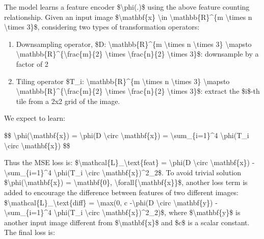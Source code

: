 The model learns a feature encoder \$\textbackslash phi(.)\$ using the above feature counting relationship. Given an input image \$\textbackslash mathbf\{x\} \textbackslash in \textbackslash mathbb\{R\}\^{}\{m \textbackslash times n \textbackslash times 3\}\$, considering two types of transformation operators:

\begin{enumerate}
\tightlist
\item
  Downsampling operator, \$D: \textbackslash mathbb\{R\}\^{}\{m \textbackslash times n \textbackslash times 3\} \textbackslash mapsto \textbackslash mathbb\{R\}\^{}\{\textbackslash frac\{m\}\{2\} \textbackslash times \textbackslash frac\{n\}\{2\} \textbackslash times 3\}\$: downsample by a factor of 2
\item
  Tiling operator \$T\_i: \textbackslash mathbb\{R\}\^{}\{m \textbackslash times n \textbackslash times 3\} \textbackslash mapsto \textbackslash mathbb\{R\}\^{}\{\textbackslash frac\{m\}\{2\} \textbackslash times \textbackslash frac\{n\}\{2\} \textbackslash times 3\}\$: extract the \$i\$-th tile from a 2x2 grid of the image.
\end{enumerate}

We expect to learn:

\$\$ \textbackslash phi(\textbackslash mathbf\{x\}) = \textbackslash phi(D \textbackslash circ \textbackslash mathbf\{x\}) = \textbackslash sum\_\{i=1\}\^{}4 \textbackslash phi(T\_i \textbackslash circ \textbackslash mathbf\{x\}) \$\$

\hyperref[counting-feature-loss]{}Thus the MSE loss is: \$\textbackslash mathcal\{L\}\_\textbackslash text\{feat\} = \textbar\textbackslash phi(D \textbackslash circ \textbackslash mathbf\{x\}) - \textbackslash sum\_\{i=1\}\^{}4 \textbackslash phi(T\_i \textbackslash circ \textbackslash mathbf\{x\})\textbar\^{}2\_2\$. To avoid trivial solution \$\textbackslash phi(\textbackslash mathbf\{x\}) = \textbackslash mathbf\{0\}, \textbackslash forall\{\textbackslash mathbf\{x\}\}\$, another loss term is added to encourage the difference between features of two different images: \$\textbackslash mathcal\{L\}\_\textbackslash text\{diff\} = \textbackslash max(0, c -\textbar\textbackslash phi(D \textbackslash circ \textbackslash mathbf\{y\}) - \textbackslash sum\_\{i=1\}\^{}4 \textbackslash phi(T\_i \textbackslash circ \textbackslash mathbf\{x\})\textbar\^{}2\_2)\$, where \$\textbackslash mathbf\{y\}\$ is another input image different from \$\textbackslash mathbf\{x\}\$ and \$c\$ is a scalar constant. The final loss is:

